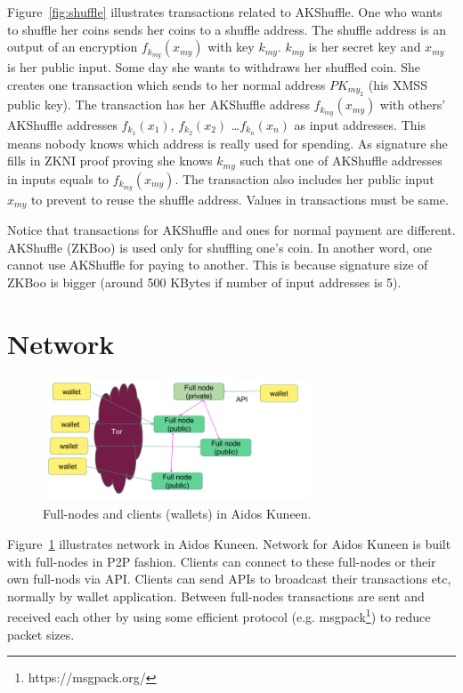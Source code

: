 \documentclass[a4paper,10pt,twocolumn]{article}
\begin{document}
 Figure~\ref{fig:shuffle} illustrates transactions related to AKShuffle. One who wants to shuffle her coins sends her coins to a shuffle address.
 The shuffle address is an output of an encryption \( f_{k_{my}}(x_{my}) \) with key \( k_{my} \). 
 \(k_{my}\) is her secret key  and \(x_{my}\) is her public input.
 Some day she wants to  withdraws her shuffled coin. She creates one transaction which sends to her normal address \(PK_{my_2}\) (his XMSS public key).
 The transaction has her AKShuffle address \( f_{k_{my}}(x_{my}) \) with others' AKShuffle addresses 
\( f_{k_{1}}(x_{1}) \), \( f_{k_{2}}(x_{2}) \) \dots \( f_{k_{n}}(x_{n}) \) as input addresses. 
This means nobody knows which address is really used for spending. As signature she fills in ZKNI proof proving she knows \( k_{my} \) such that 
one of AKShuffle addresses in inputs equals  to \( f_{k_{my}}(x_{my}) \). The transaction also includes her public input \( x_{my} \)
to prevent to reuse the shuffle address. Values in transactions must be same.

Notice that transactions for AKShuffle and ones for normal payment are different. AKShuffle (ZKBoo) is used only for shuffling one's coin.
In another word, one cannot use AKShuffle for paying to another.
This is because signature size of ZKBoo is bigger (around 500 KBytes if number of input addresses is 5).


\section{Network}
\label{sec:network}

\begin{figure}[ht]
	\begin{center}
	\includegraphics[width=80mm]{network.png}
	  \caption{Full-nodes and clients (wallets) in Aidos Kuneen.}
    \label{fig:network}
	\end{center}
 \end{figure}

 Figure~\ref{fig:network} illustrates network in Aidos Kuneen.
Network for Aidos Kuneen is built with full-nodes in P2P fashion. Clients can connect to these full-nodes
or their own full-nods via API. Clients can send APIs to broadcast their transactions etc, normally by wallet application.
 Between full-nodes transactions are sent and received each other by using some efficient protocol (e.g. msgpack\footnote{https://msgpack.org/})
 to reduce packet sizes. 
\end{document}
